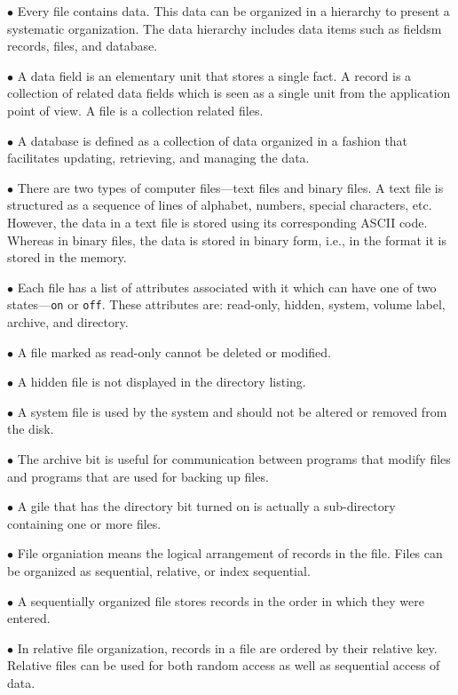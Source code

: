 \vskip 3mm
\qquad$\bullet$ Every file contains data. This data can be organized in a hierarchy to present a systematic organization. The data hierarchy includes data items such as fieldsm records, files, and database.

\vskip 3mm
\qquad$\bullet$ A data field is an elementary unit that stores a single fact. A record is a collection of related data fields which is seen as a single unit from the application point of view. A file is a collection related files.

\vskip 3mm
\qquad$\bullet$ A database is defined as a collection of data organized in a fashion that facilitates updating, retrieving, and managing the data.

\vskip 3mm
\qquad$\bullet$ There are two types of computer files---text files and binary files. A text file is structured as a sequence of lines of alphabet, numbers, special characters, etc. However, the data in a text file is stored using its corresponding ASCII code. Whereas in binary files, the data is stored in binary form, i.e., in the format it is stored in the memory.

\vskip 3mm
\qquad$\bullet$ Each file has a list of attributes associated with it which can have one of two states---{\tt on} or {\tt off}. These attributes are: read-only, hidden, system, volume label, archive, and directory.

\vskip 3mm
\qquad$\bullet$ A file marked as read-only cannot be deleted or modified.

\vskip 3mm
\qquad$\bullet$ A hidden file is not displayed in the directory listing.

\vskip 3mm
\qquad$\bullet$ A system file is used by the system and should not be altered or removed from the disk.

\vskip 3mm
\qquad$\bullet$ The archive bit is useful for communication between programs that modify files and programs that are used for backing up files.

\vskip 3mm
\qquad$\bullet$ A gile that has the directory bit turned on is actually a sub-directory containing one or more files.

\vskip 3mm
\qquad$\bullet$ File organiation means the logical arrangement of records in the file. Files can be organized as sequential, relative, or index sequential.

\vskip 3mm
\qquad$\bullet$ A sequentially organized file stores records in the order in which they were entered.

\vskip 3mm
\qquad$\bullet$ In relative file organization, records in a file are ordered by their relative key. Relative files can be used for both random access as well as sequential access of data.

